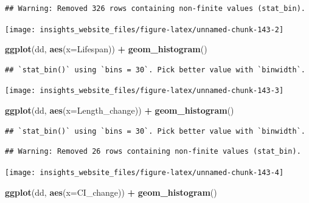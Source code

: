 \documentclass[]{book}
\newenvironment{Shaded}{\begin{snugshade}}{\end{snugshade}}
\newcommand{\DataTypeTok}[1]{\textcolor[rgb]{0.13,0.29,0.53}{#1}}
\newcommand{\KeywordTok}[1]{\textcolor[rgb]{0.13,0.29,0.53}{\textbf{#1}}}
\newcommand{\NormalTok}[1]{#1}
\newcommand{\OperatorTok}[1]{\textcolor[rgb]{0.81,0.36,0.00}{\textbf{#1}}}
\newcommand{\StringTok}[1]{\textcolor[rgb]{0.31,0.60,0.02}{#1}}
\begin{document}
\begin{verbatim}
## Warning: Removed 326 rows containing non-finite values (stat_bin).
\end{verbatim}

\begin{center}\texttt{[image: insights\_website\_files/figure-latex/unnamed-chunk-143-2]} \end{center}

\begin{Shaded}
\begin{Highlighting}[]
\KeywordTok{ggplot}\NormalTok{(dd, }\KeywordTok{aes}\NormalTok{(}\DataTypeTok{x=}\NormalTok{Lifespan)) }\OperatorTok{+}
\StringTok{  }\KeywordTok{geom_histogram}\NormalTok{()}
\end{Highlighting}
\end{Shaded}

\begin{verbatim}
## `stat_bin()` using `bins = 30`. Pick better value with `binwidth`.
\end{verbatim}

\begin{center}\texttt{[image: insights\_website\_files/figure-latex/unnamed-chunk-143-3]} \end{center}

\begin{Shaded}
\begin{Highlighting}[]
\KeywordTok{ggplot}\NormalTok{(dd, }\KeywordTok{aes}\NormalTok{(}\DataTypeTok{x=}\NormalTok{Length_change)) }\OperatorTok{+}
\StringTok{  }\KeywordTok{geom_histogram}\NormalTok{()}
\end{Highlighting}
\end{Shaded}

\begin{verbatim}
## `stat_bin()` using `bins = 30`. Pick better value with `binwidth`.
\end{verbatim}

\begin{verbatim}
## Warning: Removed 26 rows containing non-finite values (stat_bin).
\end{verbatim}

\begin{center}\texttt{[image: insights\_website\_files/figure-latex/unnamed-chunk-143-4]} \end{center}

\begin{Shaded}
\begin{Highlighting}[]
\KeywordTok{ggplot}\NormalTok{(dd, }\KeywordTok{aes}\NormalTok{(}\DataTypeTok{x=}\NormalTok{CI_change)) }\OperatorTok{+}
\StringTok{  }\KeywordTok{geom_histogram}\NormalTok{()}
\end{Highlighting}
\end{Shaded}
\end{document}
